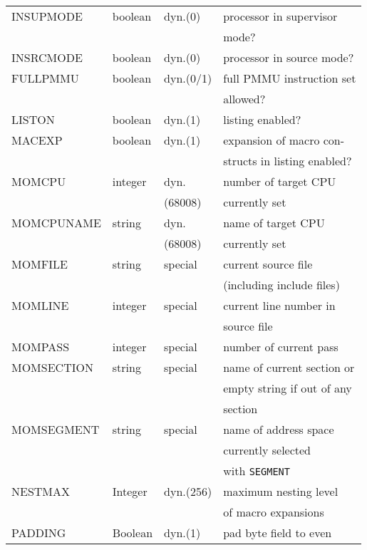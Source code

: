 \documentclass[12pt,twoside]{report}
\newcommand{\tty}[1]{{\tt #1}}
\begin{document}
\begin{center}
\begin{longtable}{|l|l|l|l|}
INSUPMODE     & boolean   & dyn.(0)    & processor in supervisor \\
              &           &            & mode? \\
INSRCMODE     & boolean   & dyn.(0)    & processor in source mode? \\
FULLPMMU      & boolean   & dyn.(0/1)  & full PMMU instruction set \\
              &           &            & allowed? \\
LISTON        & boolean   & dyn.(1)    & listing enabled? \\
MACEXP        & boolean   & dyn.(1)    & expansion of macro con- \\
              &           &            & structs in listing enabled? \\
MOMCPU        & integer   & dyn.       & number of target CPU \\
	      & 	  & (68008)    & currently set \\
MOMCPUNAME    & string    & dyn.       & name of target CPU \\
              &           & (68008)    & currently set \\
MOMFILE       & string    & special    & current source file \\
              &           &            & (including include files) \\
MOMLINE       & integer   & special    & current line number in  \\
              &           &            & source file \\
MOMPASS       & integer   & special    & number of current pass \\
MOMSECTION    & string    & special    & name of current section or \\
	      & 	  &	       & empty string if out of any \\
              &           &            & section \\
MOMSEGMENT    & string    & special    & name of address space \\
              &           &            & currently selected \\
              &           &            & with \tty{SEGMENT} \\
NESTMAX       &  Integer  & dyn.(256)  & maximum nesting level \\
              &           &            & of macro expansions \\
PADDING       & Boolean   & dyn.(1)    & pad byte field to even \\

\end{longtable}
\end{center}
\end{document}
